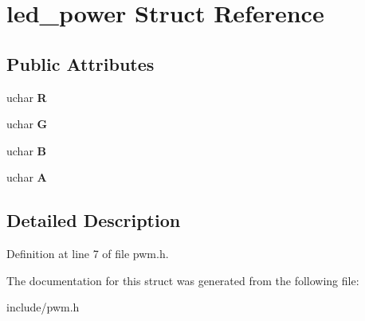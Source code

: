 \hypertarget{structled__power}{\section{led\-\_\-power \-Struct \-Reference}
\label{structled__power}
}
\subsection*{\-Public \-Attributes}
\begin{DoxyCompactItemize}
\item 
\hypertarget{structled__power_abd76b562da9a13d1181007bdeb262e29}{uchar {\bfseries \-R}}\label{structled__power_abd76b562da9a13d1181007bdeb262e29}

\item 
\hypertarget{structled__power_a45f2389e407afd7992b730737a4214ba}{uchar {\bfseries \-G}}\label{structled__power_a45f2389e407afd7992b730737a4214ba}

\item 
\hypertarget{structled__power_a5a8c8976da86869b1443f581d0fbd096}{uchar {\bfseries \-B}}\label{structled__power_a5a8c8976da86869b1443f581d0fbd096}

\item 
\hypertarget{structled__power_a985a5a0a73bc2564130d22715a4412c9}{uchar {\bfseries \-A}}\label{structled__power_a985a5a0a73bc2564130d22715a4412c9}

\end{DoxyCompactItemize}


\subsection{\-Detailed \-Description}


\-Definition at line 7 of file pwm.\-h.



\-The documentation for this struct was generated from the following file\-:\begin{DoxyCompactItemize}
\item 
include/pwm.\-h\end{DoxyCompactItemize}
